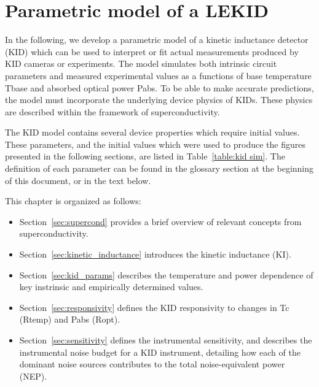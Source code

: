 \chapter{Parametric model of a LEKID}\label{kid_model}

In the following, we develop a parametric model of a kinetic inductance detector (KID) which can be used to interpret or fit actual measurements produced by KID cameras or experiments. The model simulates both intrinsic circuit parameters and measured experimental values as a functions of base temperature \gls{Tbase} and absorbed optical power \gls{Pabs}. To be able to make accurate predictions, the model must incorporate the underlying device physics of KIDs. These physics are described within the framework of superconductivity.

The KID model contains several device properties which require initial values. These parameters, and the initial values which were used to produce the figures presented in the following sections, are listed in Table~\ref{table:kid sim}. The definition of each parameter can be found in the glossary section at the beginning of this document, or in the text below.

This chapter is organized as follows:

\begin{itemize}[nosep]
  \item Section~\ref{sec:supercond} provides a brief overview of relevant concepts from superconductivity.
  \item Section~\ref{sec:kinetic_inductance} introduces the kinetic inductance (KI).
  \item Section~\ref{sec:kid_params} describes the temperature and power dependence of key instrinsic and empirically determined values.
  \item Section~\ref{sec:responsivity} defines the KID responsivity to changes in \gls{Tc} (\gls{Rtemp}) and \gls{Pabs} (\gls{Ropt}).
  \item Section~\ref{sec:sensitivity} defines the instrumental sensitivity, and describes the instrumental noise budget for a KID instrument, detailing how each of the dominant noise sources contributes to the total noise-equivalent power (NEP).
\end{itemize}

